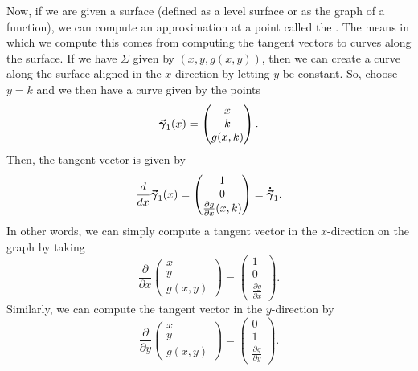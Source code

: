                                         Now, if we are given a surface (defined as a level surface or as the graph of a function), we can compute an approximation at a point called the . The means in which we compute this comes from computing the tangent vectors to curves along the surface.  If we have $\Sigma$ given by $(x,y,g(x,y))$, then we can create a curve along the surface aligned in the $x$-direction by letting $y$ be constant.  So, choose $y=k$ and we then have a curve given by the points 
                                        \[
                                        \boldsymbol{\vec{\gamma}}_1(x) = \begin{pmatrix} x \\ k \\ g(x,k) \end{pmatrix}.
                                        \] 
                                        Then, the tangent vector is given by
                                        \[
                                        \frac{d}{dx} \boldsymbol{\vec{\gamma}}_1(x) = \begin{pmatrix} 1 \\ 0 \\ \frac{\partial g}{\partial x} (x,k) \end{pmatrix} = \boldsymbol{\dot{\vec{\gamma}}}_1.
                                        \]
                                        In other words, we can simply compute a tangent vector in the $x$-direction on the graph by taking
                                        \[
                                        \frac{\partial}{\partial x} \begin{pmatrix} x \\ y \\ g(x,y) \end{pmatrix} = \begin{pmatrix} 1 \\ 0 \\ \frac{\partial g}{\partial x} \end{pmatrix}.
                                        \]
                                        Similarly, we can compute the tangent vector in the $y$-direction by
                                        \[
                                        \frac{\partial}{\partial y} \begin{pmatrix} x \\ y \\ g(x,y) \end{pmatrix} = \begin{pmatrix} 0 \\ 1 \\ \frac{\partial g}{\partial y} \end{pmatrix}.
                                        \]
